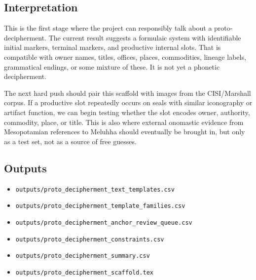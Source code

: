 \subsection{Interpretation}

This is the first stage where the project can responsibly talk about a proto-decipherment. The current result suggests a formulaic system with identifiable initial markers, terminal markers, and productive internal slots. That is compatible with owner names, titles, offices, places, commodities, lineage labels, grammatical endings, or some mixture of these. It is not yet a phonetic decipherment.

The next hard push should pair this scaffold with images from the CISI/Marshall corpus. If a productive slot repeatedly occurs on seals with similar iconography or artifact function, we can begin testing whether the slot encodes owner, authority, commodity, place, or title. This is also where external onomastic evidence from Mesopotamian references to Meluhha should eventually be brought in, but only as a test set, not as a source of free guesses.

\subsection{Outputs}

\begin{itemize}
  \item \texttt{outputs/proto\_decipherment\_text\_templates.csv}
  \item \texttt{outputs/proto\_decipherment\_template\_families.csv}
  \item \texttt{outputs/proto\_decipherment\_anchor\_review\_queue.csv}
  \item \texttt{outputs/proto\_decipherment\_constraints.csv}
  \item \texttt{outputs/proto\_decipherment\_summary.csv}
  \item \texttt{outputs/proto\_decipherment\_scaffold.tex}
\end{itemize}
